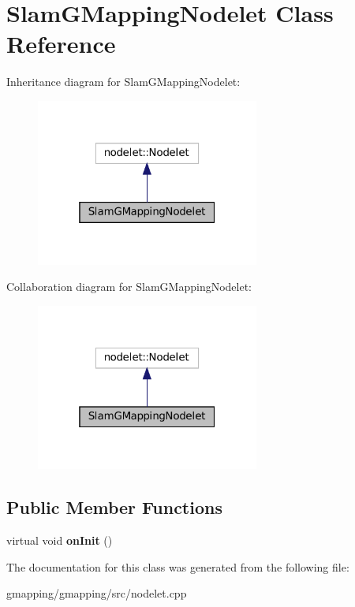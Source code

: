 \hypertarget{classSlamGMappingNodelet}{}\section{Slam\+G\+Mapping\+Nodelet Class Reference}
\label{classSlamGMappingNodelet}


Inheritance diagram for Slam\+G\+Mapping\+Nodelet\+:
\nopagebreak
\begin{figure}[H]
\begin{center}
\leavevmode
\includegraphics[width=208pt]{classSlamGMappingNodelet__inherit__graph}
\end{center}
\end{figure}


Collaboration diagram for Slam\+G\+Mapping\+Nodelet\+:
\nopagebreak
\begin{figure}[H]
\begin{center}
\leavevmode
\includegraphics[width=208pt]{classSlamGMappingNodelet__coll__graph}
\end{center}
\end{figure}
\subsection*{Public Member Functions}
\begin{DoxyCompactItemize}
\item 
\mbox{\label{classSlamGMappingNodelet_afeec962f825e389b6a52cd7f9debf425}} 
virtual void {\bfseries on\+Init} ()
\end{DoxyCompactItemize}


The documentation for this class was generated from the following file\+:\begin{DoxyCompactItemize}
\item 
gmapping/gmapping/src/nodelet.\+cpp\end{DoxyCompactItemize}
